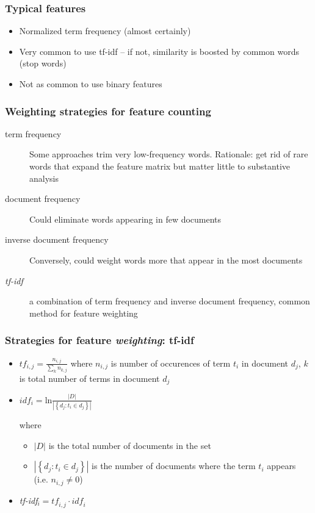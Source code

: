 \documentclass{beamer}
\begin{document}
\begin{frame}
	\frametitle{Typical features}
	\begin{itemize}
		\item Normalized term frequency (almost certainly)
		\item Very common to use tf-idf -- if not, similarity is boosted
		by common words (stop words)
		\item Not as common to use binary features
	\end{itemize}
	
\end{frame}














\begin{frame}
	\frametitle{Weighting strategies for feature counting}
	\begin{description}
		\item[term frequency] Some approaches trim very low-frequency words.
		Rationale: get rid of rare words that expand the feature matrix
		but matter little to substantive analysis
		\item[document frequency] Could eliminate words appearing in few documents
		\item[inverse document frequency] Conversely, could weight words
		more that appear in the most documents
		\item[\emph{tf-idf}] a combination of term frequency and inverse
		document frequency, common method for feature weighting
	\end{description}
\end{frame}

\begin{frame}
	\frametitle{Strategies for feature \emph{weighting}: tf-idf}
	\begin{itemize}
		\setlength{\itemsep}{3ex}
		\item $tf_{i,j} = \frac{n_{i,j}}{\sum_kn_{k,j}}$
		where $n_{i,j}$ is number of occurences of term $t_i$ in document
		$d_j$, $k$ is total number of terms in document $d_j$
		\item $idf_i = \mathrm{ln} \frac{|D|}{|\left\{ d_j: t_i \in d_j \right\} |}$
		
		where
		\begin{itemize}
			\item $|D|$ is the total number of documents in the set
			\item $|\left\{ d_j: t_i \in d_j \right\} |$ is the number of
			documents where the term $t_i$ appears (i.e. $n_{i,j}\neq 0$)
		\end{itemize}
		
		\item \emph{tf-idf}$_i = \mathit{tf}_{i,j} \cdot \mathit{idf}_i$
	\end{itemize}
\end{frame}
\end{document}
